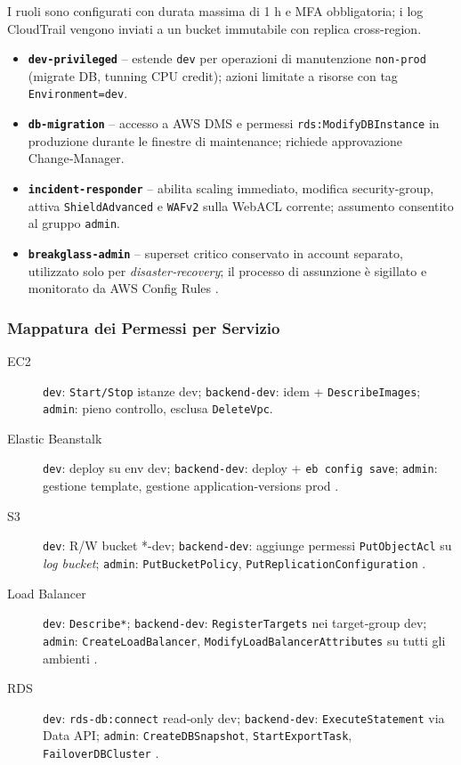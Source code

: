 I ruoli sono configurati con durata massima di 1 h e MFA obbligatoria; i log CloudTrail vengono inviati a un bucket immutabile con
replica cross-region.

\begin{itemize}
  \item \textbf{\texttt{dev‑privileged}} – estende \texttt{dev} per operazioni di manutenzione \texttt{non‑prod} (migrate DB, tunning CPU credit);     azioni limitate a risorse con tag \texttt{Environment=dev}.  
  \item \textbf{\texttt{db‑migration}} – accesso a AWS DMS e permessi \texttt{rds:ModifyDBInstance} in produzione durante le finestre di
        maintenance; richiede approvazione Change‑Manager.  
  \item \textbf{\texttt{incident‑responder}} – abilita scaling immediato,
        modifica security‑group, attiva \texttt{ShieldAdvanced} e
        \texttt{WAFv2} sulla WebACL corrente; assumento consentito al gruppo
        \texttt{admin}.  
  \item \textbf{\texttt{breakglass‑admin}} – superset critico conservato in
        account separato, utilizzato solo per \emph{disaster‑recovery}; il
        processo di assunzione è sigillato e monitorato da AWS Config Rules \cite{AWSSTS}.  
\end{itemize}

\subsubsection{Mappatura dei Permessi per Servizio}
\label{subsubsec:mappa_servizi}

\begin{description}
  \item[EC2] \texttt{dev}: \texttt{Start/Stop} istanze dev; \texttt{backend‑dev}: idem + \texttt{DescribeImages}; \texttt{admin}: pieno controllo, esclusa
        \texttt{DeleteVpc}.  
  \item[Elastic Beanstalk] \texttt{dev}: deploy su env dev; \texttt{backend‑dev}: deploy + \texttt{eb config save}; \texttt{admin}: gestione template, gestione
        application‑versions prod \cite{AWSEBRole}.  
  \item[S3] \texttt{dev}: R/W bucket *-dev; \texttt{backend‑dev}: aggiunge permessi
        \texttt{PutObjectAcl} su \emph{log bucket}; \texttt{admin}:
        \texttt{PutBucketPolicy}, \texttt{PutReplicationConfiguration} \cite{AWSS3Security}.  
  \item[Load Balancer] \texttt{dev}: \texttt{Describe*}; \texttt{backend‑dev}: \texttt{RegisterTargets} nei target‑group dev; \texttt{admin}: \texttt{CreateLoadBalancer}, \texttt{ModifyLoadBalancerAttributes} su tutti gli ambienti \cite{AWSELBIAM}.  
  \item[RDS] \texttt{dev}: \texttt{rds-db:connect} read‑only dev; \texttt{backend‑dev}:
        \texttt{ExecuteStatement} via Data API; \texttt{admin}:
        \texttt{CreateDBSnapshot}, \texttt{StartExportTask}, \texttt{FailoverDBCluster} \cite{AWSRDSIAM}.  
\end{description}

